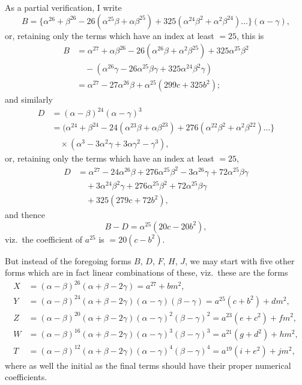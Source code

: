 \documentclass[11pt,a4paper]{article}
\theoremstyle{definition}
\begin{document}
As a partial verification, I write
\[
B = \{\alpha^{26} + \beta^{26} - 26(\alpha^{25}\beta + \alpha\beta^{25}) + 325(\alpha^{24}\beta^2 + \alpha^2\beta^{24}) \ldots\}(\alpha - \gamma),
\]
or, retaining only the terms which have an index at least $= 25$, this is
\begin{align*}
B &= \alpha^{27} + \alpha\beta^{26} - 26(\alpha^{26}\beta + \alpha^2\beta^{25}) + 325\alpha^{25}\beta^2\\
&\quad - (\alpha^{26}\gamma - 26\alpha^{25}\beta\gamma + 325\alpha^{24}\beta^2\gamma)\\
&= \alpha^{27} - 27\alpha^{26}\beta + \alpha^{25}(299c + 325b^2);
\end{align*}
and similarly
\begin{align*}
D &= (\alpha - \beta)^{24}(\alpha - \gamma)^3\\
&= (\alpha^{24} + \beta^{24} - 24(\alpha^{23}\beta + \alpha\beta^{23}) + 276(\alpha^{22}\beta^2 + \alpha^2\beta^{22}) \ldots\}\\
&\quad \times (\alpha^3 - 3\alpha^2\gamma + 3\alpha\gamma^2 - \gamma^3),
\end{align*}
or, retaining only the terms which have an index at least $= 25$,
\begin{align*}
D &= \alpha^{27} - 24\alpha^{26}\beta + 276\alpha^{25}\beta^2 - 3\alpha^{26}\gamma + 72\alpha^{25}\beta\gamma\\
&\quad + 3\alpha^{24}\beta^2\gamma + 276\alpha^{25}\beta^2 + 72\alpha^{25}\beta\gamma\\
&\quad + 325(279c + 72b^2),
\end{align*}
and thence
\[
B - D = \alpha^{25}(20c - 20b^2),
\]
viz.\ the coefficient of $a^{25}$ is $= 20(c - b^2)$.

But instead of the foregoing forms $B$, $D$, $F$, $H$, $J$, we may start with five other forms which are in fact linear combinations of these, viz.\ these are the forms
\begin{align*}
X &= (\alpha - \beta)^{26}(\alpha + \beta - 2\gamma) = a^{27} + bm^2,\\
Y &= (\alpha - \beta)^{24}(\alpha + \beta - 2\gamma)(\alpha - \gamma)(\beta - \gamma) = a^{25}(c + b^2) + dm^2,\\
Z &= (\alpha - \beta)^{20}(\alpha + \beta - 2\gamma)(\alpha - \gamma)^2(\beta - \gamma)^2 = a^{23}(e + c^2) + fm^2,\\
W &= (\alpha - \beta)^{16}(\alpha + \beta - 2\gamma)(\alpha - \gamma)^3(\beta - \gamma)^3 = a^{21}(g + d^2) + hm^2,\\
T &= (\alpha - \beta)^{12}(\alpha + \beta - 2\gamma)(\alpha - \gamma)^4(\beta - \gamma)^4 = a^{19}(i + e^2) + jm^2,
\end{align*}
where as well the initial as the final terms should have their proper numerical coefficients.
\end{document}
